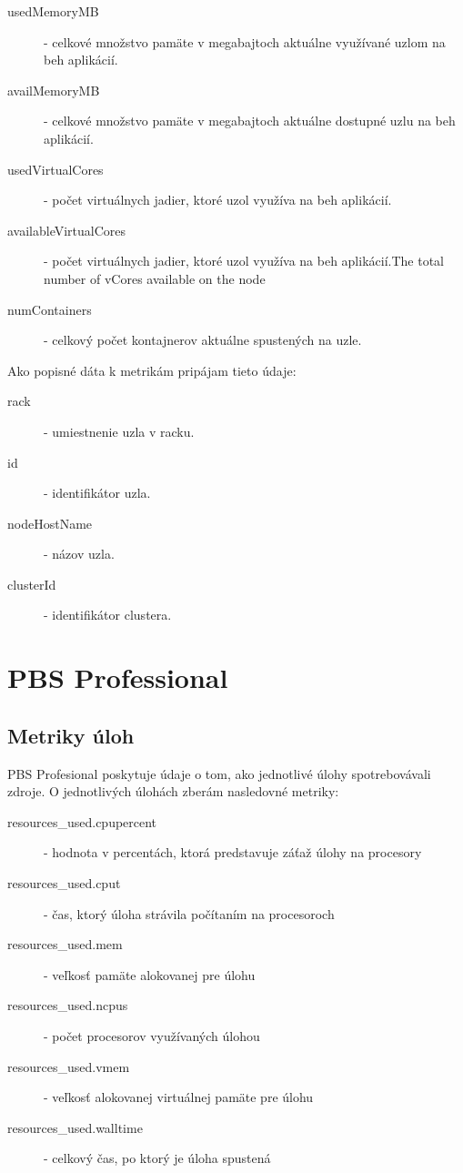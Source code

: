 \documentclass[printed,11pt,twoside,color,cover,table]{fithesis3}
\begin{document}
\begin{description}
\item[usedMemoryMB] - celkové množstvo pamäte v megabajtoch aktuálne využívané uzlom na beh aplikácií.
\item[availMemoryMB] - celkové množstvo pamäte v megabajtoch aktuálne dostupné uzlu na beh aplikácií.
\item[usedVirtualCores] - počet virtuálnych jadier, ktoré uzol využíva na beh aplikácií.
\item[availableVirtualCores] - počet virtuálnych jadier, ktoré uzol využíva na beh aplikácií.The total number of vCores available on the node
\item[numContainers] - celkový počet kontajnerov aktuálne spustených na uzle.
\end{description}

Ako popisné dáta k metrikám pripájam tieto údaje:
\begin{description}
\item[rack] - umiestnenie uzla v racku.
\item[id] - identifikátor uzla.
\item[nodeHostName] - názov uzla.
\item[clusterId] - identifikátor clustera.
\end{description}

\section{PBS Professional}
\subsection{Metriky úloh}
PBS Profesional poskytuje údaje o tom, ako jednotlivé úlohy spotrebovávali zdroje. O jednotlivých úlohách zberám nasledovné metriky:

\begin{description}
\item[resources\_used.cpupercent] - hodnota v percentách, ktorá predstavuje záťaž úlohy na procesory
\item[resources\_used.cput] - čas, ktorý úloha strávila počítaním na procesoroch
\item[resources\_used.mem] - veľkosť pamäte alokovanej pre úlohu
\item[resources\_used.ncpus] - počet procesorov využívaných úlohou
\item[resources\_used.vmem] - veľkosť alokovanej virtuálnej pamäte pre úlohu
\item[resources\_used.walltime] - celkový čas, po ktorý je úloha spustená
\end{description}
\end{document}
